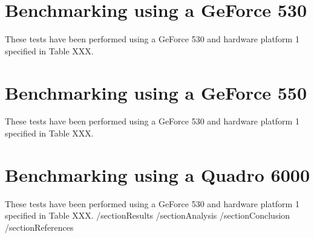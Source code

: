 \documentclass[paper=a4, fontsize=11pt]{scrartcl}
\numberwithin{equation}{section}		%
\numberwithin{figure}{section}			%
\numberwithin{table}{section}				%
\begin{document}
\section{Benchmarking using a GeForce 530}
These tests have been performed using a GeForce 530 and hardware platform 1 specified in Table XXX.

\section{Benchmarking using a GeForce 550}
These tests have been performed using a GeForce 530 and hardware platform 1 specified in Table XXX.

\section{Benchmarking using a Quadro 6000}
These tests have been performed using a GeForce 530 and hardware platform 1 specified in Table XXX.
\newpage
/section{Results}
\newpage
/section{Analysis}
\newpage
/section{Conclusion}
\newpage
/section{References}

\end{document}
